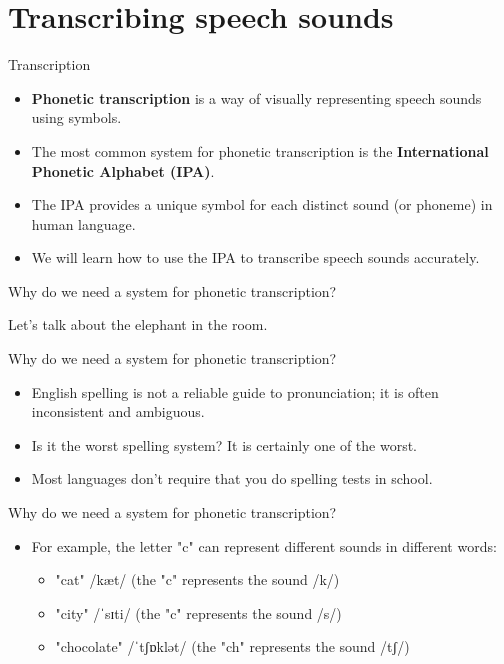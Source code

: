 \documentclass{beamer}
\begin{document}
\section{Transcribing speech sounds}

\begin{frame}{Transcription}
    \begin{itemize}
        \item \textbf{Phonetic transcription} is a way of visually representing speech sounds using symbols.
        \item The most common system for phonetic transcription is the \textbf{International Phonetic Alphabet (IPA)}.
        \item The IPA provides a unique symbol for each distinct sound (or phoneme) in human language.
        \item We will learn how to use the IPA to transcribe speech sounds accurately.
    \end{itemize}
\end{frame}

\begin{frame}{Why do we need a system for phonetic transcription?}
    \begin{center}
        \huge Let's talk about the elephant in the room.
    \end{center}
    
\end{frame}

\begin{frame}{Why do we need a system for phonetic transcription?}
    \begin{itemize}
        \item English spelling is not a reliable guide to pronunciation; it is often inconsistent and ambiguous.
        \item Is it the worst spelling system? It is certainly one of the worst.
        \item Most languages don't require that you do spelling tests in school.
    \end{itemize}
\end{frame}

\begin{frame}{Why do we need a system for phonetic transcription?}
    \begin{itemize}
        \item For example, the letter "c" can represent different sounds in different words:
        \begin{itemize}
            \item "cat" /kæt/ (the "c" represents the sound /k/)
            \item "city" /ˈsɪti/ (the "c" represents the sound /s/)
            \item "chocolate" /ˈtʃɒklət/ (the "ch" represents the sound /tʃ/)
        \end{itemize}
    \end{itemize}
\end{frame}
\end{document}
